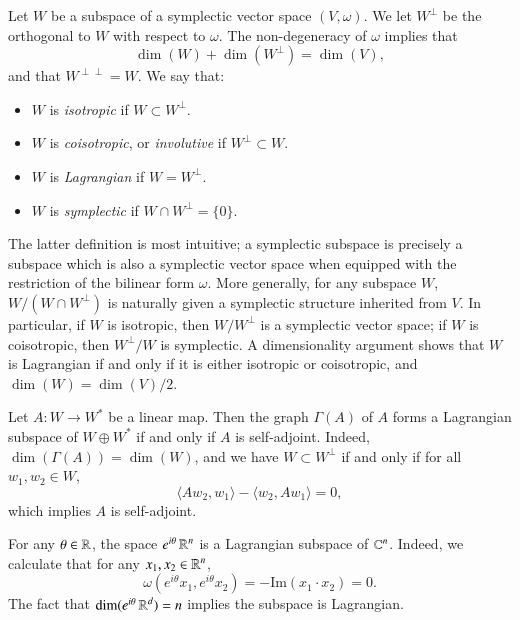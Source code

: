 Let $W$ be a subspace of a symplectic vector space $(V,\omega)$. We let $W^\perp$ be the orthogonal to $W$ with respect to $\omega$. The non-degeneracy of $\omega$ implies that
%
\[ \dim(W) + \dim(W^\perp) = \dim(V), \]
%
and that $W^{\perp \perp} = W$. We say that:
%
\begin{itemize}
    \item $W$ is \emph{isotropic} if $W \subset W^\perp$.
    \item $W$ is \emph{coisotropic}, or \emph{involutive} if $W^\perp \subset W$.
    \item $W$ is \emph{Lagrangian} if $W = W^\perp$.
    \item $W$ is \emph{symplectic} if $W \cap W^\perp = \{ 0 \}$.
\end{itemize}
%
The latter definition is most intuitive; a symplectic subspace is precisely a subspace which is also a symplectic vector space when equipped with the restriction of the bilinear form $\omega$. More generally, for any subspace $W$, $W / (W \cap W^\perp)$ is naturally given a symplectic structure inherited from $V$. In particular, if $W$ is isotropic, then $W/W^\perp$ is a symplectic vector space; if $W$ is coisotropic, then $W^\perp / W$ is symplectic. A dimensionality argument shows that $W$ is Lagrangian if and only if it is either isotropic or coisotropic, and $\dim(W) = \dim(V) / 2$.

\begin{example}
    Let $A: W \to W^*$ be a linear map. Then the graph $\Gamma(A)$ of $A$ forms a Lagrangian subspace of $W \oplus W^*$ if and only if $A$ is self-adjoint. Indeed, $\dim(\Gamma(A)) = \dim(W)$, and we have $W \subset W^\perp$ if and only if for all $w_1,w_2 \in W$,
    \[ \langle Aw_2, w_1 \rangle - \langle w_2, Aw_1 \rangle = 0, \]
    which implies $A$ is self-adjoint.
\end{example}

\begin{example}
    For any $\theta \in \operatorname{\mathbb{R}}$, the space $e^{i \theta} \operatorname{\mathbb{R}}^n$ is a Lagrangian subspace of $\operatorname{\mathbb{C}}^n$. Indeed, we calculate that for any $x_1,x_2 \in \operatorname{\mathbb{R}}^n$,
    \[ \omega(e^{i \theta} x_1, e^{i \theta} x_2) = - \text{Im} ( x_1 \cdot x_2 ) = 0. \]
    The fact that $\dim(e^{i \theta} \operatorname{\mathbb{R}}^d) = n$ implies the subspace is Lagrangian.
\end{example}

